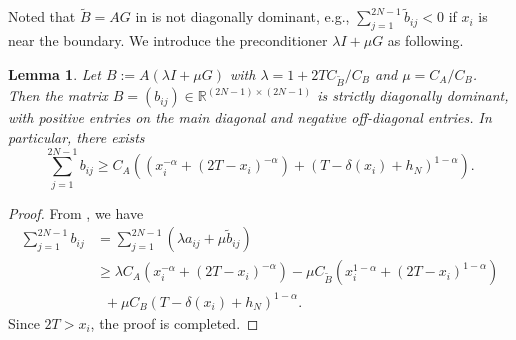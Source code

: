 \documentclass{amsart}
\newtheorem{lemma}[theorem]{Lemma}
\theoremstyle{definition}
\theoremstyle{remark}
\numberwithin{equation}{section}
\begin{document}
Noted that $\tilde{B}=AG$ in  is not diagonally dominant, e.g., 
$\sum_{j=1}^{2N-1} \tilde{b}_{ij} < 0 $ if $x_i$ is near the boundary.
We introduce the preconditioner $\lambda I + \mu G$ as following.
\begin{lemma}\label{thm:ALGisM}
  Let \(B := A(\lambda I+ \mu G)\) 
  with \(\lambda = 1+2T C_{\tilde{B}} / C_B\) and \(\mu= C_A/C_B \). 
  Then the matrix $B = (b_{ij})\in \mathbb{R}^{(2N-1) \times (2N-1)}$ is strictly diagonally dominant, with positive entries on the main diagonal and negative off-diagonal entries.
  In particular, there exists
  \begin{equation*}
    \sum_{j=1}^{2N-1} b_{ij} \ge 
    C_A
    \left( (x_i^{-\alpha} + (2T-x_i)^{-\alpha}) + (T - \delta(x_{i}) + h_N)^{1-\alpha} \right).
  \end{equation*}
\end{lemma}
\begin{proof}
  From , we have 
  \begin{equation*}
      \begin{aligned}
          \sum_{j=1}^{2N-1} b_{ij} &= \sum_{j=1}^{2N-1} \left( \lambda a_{ij} + \mu \tilde{b}_{ij} \right) \\
           & \ge \lambda C_A \left( x_i^{-\alpha} + (2T-x_i)^{-\alpha} \right)
            - \mu C_{\tilde{B}} \left( x_i^{1-\alpha} + (2T-x_i)^{1-\alpha} \right) \\
           & \;\; + \mu C_B \left( T-\delta(x_i) + h_N \right)^{1-\alpha} .
      \end{aligned}
  \end{equation*}
  Since $2T>x_i$, the proof is completed.
\end{proof}
\end{document}
